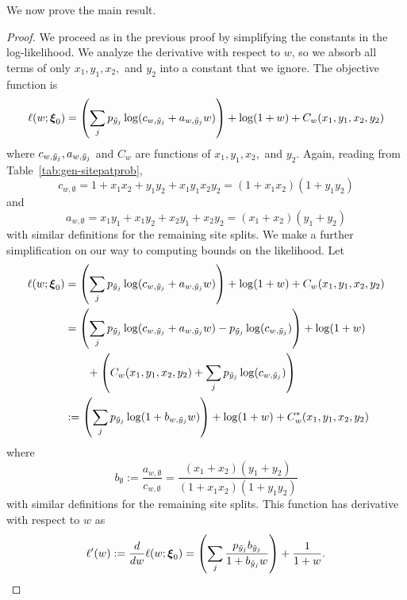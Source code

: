 We now prove the main result.

\topoInconsist*

\begin{proof}
We proceed as in the previous proof by simplifying the constants in the log-likelihood.
We analyze the derivative with respect to $w$, so we absorb all terms of only $x_1,y_1,x_2,$ and $y_2$ into a constant that we ignore.
The objective function is
\begin{align*}
\ell(w; \boldsymbol\xi_0) = \left(\sum_j p_{\tilde{y}_j} \log(c_{w,\tilde{y}_j} + a_{w,\tilde{y}_j}w)\right) + \log(1+w) + C_w(x_1,y_1,x_2,y_2)
\end{align*}
where $c_{w,\tilde{y}_j},a_{w,\tilde{y}_j}$ and $C_w$ are functions of $x_1,y_1,x_2,$ and $y_2$.
Again, reading from Table~\ref{tab:gen-sitepatprob},
\[
c_{w,\emptyset} = 1+x_1x_2+y_1y_2+x_1y_1x_2y_2 = (1+x_1x_2)(1+y_1y_2)
\]
and
\[
a_{w,\emptyset} = x_1y_1+x_1y_2+x_2y_1+x_2y_2 = (x_1+x_2)(y_1+y_2)
\]
with similar definitions for the remaining site splits.
We make a further simplification on our way to computing bounds on the likelihood.
Let
\begin{align*}
\ell(w; \boldsymbol\xi_0) &= \left(\sum_j p_{\tilde{y}_j} \log(c_{w,\tilde{y}_j} + a_{w,\tilde{y}_j}w)\right) + \log(1+w) + C_w(x_1,y_1,x_2,y_2) \\
        &= \left(\sum_j p_{\tilde{y}_j} \log(c_{w,\tilde{y}_j} + a_{w,\tilde{y}_j}w) - p_{\tilde{y}_j} \log(c_{w,\tilde{y}_j})\right) + \log(1+w) \\
        &\qquad + \left(C_w(x_1,y_1,x_2,y_2) + \sum_j p_{\tilde{y}_j} \log(c_{w,\tilde{y}_j})\right) \\
        &:= \left(\sum_j p_{\tilde{y}_j} \log(1 + b_{w,\tilde{y}_j}w)\right) + \log(1+w) + C^*_w(x_1,y_1,x_2,y_2)
\end{align*}
where
\[
b_{\emptyset} := \frac{a_{w,\emptyset}}{c_{w,\emptyset}} = \frac{(x_1+x_2)(y_1+y_2)}{(1+x_1x_2)(1+y_1y_2)}
\]
with similar definitions for the remaining site splits.
This function has derivative with respect to $w$ as
\begin{align*}
\ell'(w) := \frac{d}{dw} \ell(w; \boldsymbol\xi_0) =  \left(\sum_j \frac{p_{\siteSplit_j}b_{\siteSplit_j}}{1 + b_{\siteSplit_j}w}\right) + \frac{1}{1+w}.

\end{align*}
\end{proof}
